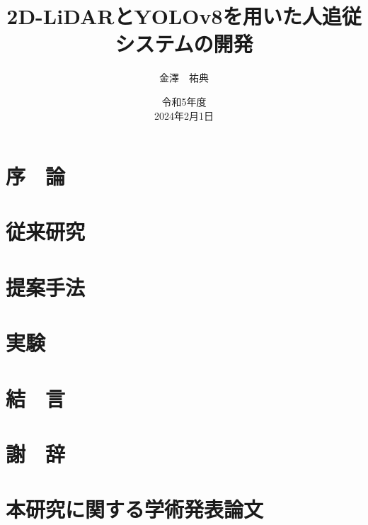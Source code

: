\documentclass[12pt,a4paper]{jreport}
\title{2D-LiDARとYOLOv8を用いた人追従システムの開発}
\author{金澤　祐典}
\date{令和5年度\\2024年2月1日}
\begin{document}
\maketitle

\tableofcontents
\listoffigures
\listoftables
\newpage
{}
\setcounter{page}{1}

\chapter{序　論}

\chapter{従来研究}

\chapter{提案手法}

\chapter{実験}

\chapter{結　言}

\chapter*{謝　辞}



\chapter*{本研究に関する学術発表論文}

\end{document}

